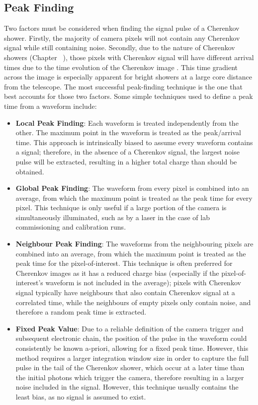 \subsection{Peak Finding} \label{peakfinding}

Two factors must be considered when finding the signal pulse of a Cherenkov shower. Firstly, the majority of camera pixels will not contain any Cherenkov signal while still containing noise. Secondly, due to the nature of Cherenkov showers (Chapter~ ), those pixels with Cherenkov signal will have different arrival times due to the time evolution of the Cherenkov image . This time gradient across the image is especially apparent for bright showers at a large core distance from the telescope. The most successful peak-finding technique is the one that best accounts for those two factors. Some simple techniques used to define a peak time from a waveform include:
\begin{itemize}
	\item \textbf{Local Peak Finding}: Each waveform is treated independently from the other. The maximum point in the waveform is treated as the peak/arrival time. This approach is intrinsically biased to assume every waveform contains a signal; therefore, in the absence of a Cherenkov signal, the largest noise pulse will be extracted, resulting in a higher total charge than should be obtained.
	\item \textbf{Global Peak Finding}: The waveform from every pixel is combined into an average, from which the maximum point is treated as the peak time for every pixel. This technique is only useful if a large portion of the camera is simultaneously illuminated, such as by a laser in the case of lab commissioning and calibration runs.
	\item \textbf{Neighbour Peak Finding}: The waveforms from the neighbouring pixels are combined into an average, from which the maximum point is treated as the peak time for the pixel-of-interest. This technique is often preferred for Cherenkov images as it has a reduced charge bias (especially if the pixel-of-interest's waveform is not included in the average); pixels with Cherenkov signal typically have neighbours that also contain Cherenkov signal at a correlated time, while the neighbours of empty pixels only contain noise, and therefore a random peak time is extracted.
	\item \textbf{Fixed Peak Value}: Due to a reliable definition of the camera trigger and subsequent electronic chain, the position of the pulse in the waveform could consistently be known a-priori, allowing for a fixed peak time. However, this method requires a larger integration window size in order to capture the full pulse in the tail of the Cherenkov shower, which occur at a later time than the initial photons which trigger the camera, therefore resulting in a larger noise included in the signal. However, this technique usually contains the least bias, as no signal is assumed to exist.
\end{itemize}

